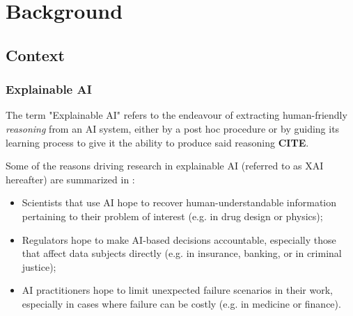 \documentclass[../main.tex]{subfiles}
\begin{document}
\chapter{Background} %
\label{Chapter1} %


\newcommand{\keyword}[1]{\textbf{#1}}
\newcommand{\tabhead}[1]{\textbf{#1}}
\newcommand{\code}[1]{\texttt{#1}}
\newcommand{\file}[1]{\texttt{\bfseries#1}}
\newcommand{\option}[1]{\texttt{\itshape#1}}

\newcommand{\method}[1]{\texttt{#1}}
\newcommand{\citenote}{\textbf{CITE}}


\section{Context}

\subsection{Explainable AI}

The term "Explainable AI" refers to the endeavour of extracting human-friendly \emph{reasoning} from an AI system, either by a post hoc procedure or by guiding its learning process to give it the ability to produce said reasoning \citenote{}.

Some of the reasons driving research in explainable AI (referred to as XAI hereafter) are summarized in \cite{zhangSurvey2021}:
\begin{itemize}
    \item Scientists that use AI hope to recover human-understandable information pertaining to their problem of interest (e.g. in drug design or physics);
    \item Regulators hope to make AI-based decisions accountable, especially those that affect data subjects directly (e.g. in insurance, banking, or in criminal justice);
    \item AI practitioners hope to limit unexpected failure scenarios in their work, especially in cases where failure can be costly (e.g. in medicine or finance).
\end{itemize}
\end{document}
